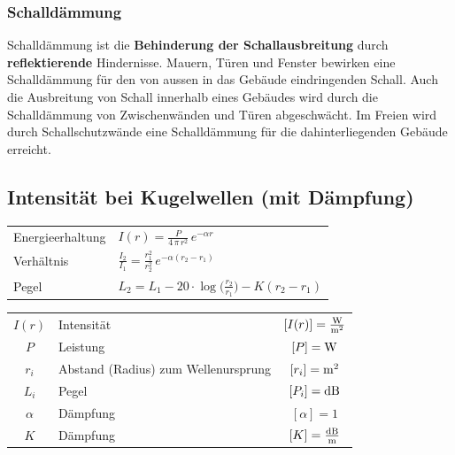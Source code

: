 
\subsubsection{Schalldämmung} 

Schalldämmung ist die \textbf{Behinderung der Schallausbreitung} durch
\textbf{reflektierende} Hindernisse. Mauern, Türen und Fenster bewirken eine
Schalldämmung für den von aussen in das Gebäude eindringenden
Schall. Auch die Ausbreitung von Schall innerhalb eines Gebäudes wird
durch die Schalldämmung von Zwischenwänden und Türen
abgeschwächt. Im Freien wird durch Schallschutzwände eine
Schalldämmung für die dahinterliegenden Gebäude erreicht.




\subsection{Intensität bei Kugelwellen (mit Dämpfung)}

\renewcommand{\arraystretch}{2.7}
\begin{tabular}{ll}
Energieerhaltung & $ \boxed{ I(r) = \frac{P}{4 \, \pi \, r^2} \, e^{- \alpha r}}$ \\

Verhältnis & $\boxed{ \frac{I_2}{I_1} = \frac{r_1^2}{r_2^2} \, e^{- \alpha (r_2 - r_1)} }$ \\

Pegel & $\boxed{ L_2 = L_1 - 20 \cdot \log \Big( \frac{r_2}{r_1} \Big) - K (r_2 - r_1)  }$ \\
\end{tabular}
\renewcommand{\arraystretch}{1}

\vspace{0.2cm}


\renewcommand{\arraystretch}{1.3}
\begin{tabular}{clc}
$I(r)$ & Intensität & $[I(r)] = \frac{\mathrm{W}}{\mathrm{m}^2}$ \\
$P$ & Leistung & $[P] = \mathrm{W}$ \\
$r_i$ & Abstand (Radius) zum Wellenursprung & $[r_i] = \mathrm{m}^2$\\
$L_i$ & Pegel & $[P_i] = \mathrm{dB}$ \\
$\alpha$ & Dämpfung & $[\alpha] = 1$ \\
$K$ & Dämpfung & $[K] = \frac{\mathrm{dB}}{\mathrm{m}}$
\end{tabular}
\renewcommand{\arraystretch}{1}




